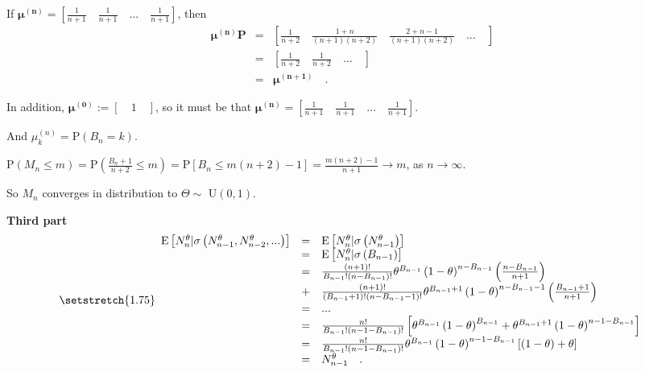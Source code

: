 \documentclass[11pt]{article} %
\begin{document}
If $\boldsymbol{\mu^{(n)}}=\left[\frac{1}{n+1} \quad
\frac{1}{n+1} \quad \hdots \quad \frac{1}{n+1}\right]$, then
\begin{equation*}
\begin{array}{lll}
 \boldsymbol{\mu^{(n)}}\mathbf{P}&=&\left[\frac{1}{n+2} \quad \frac{1+n}{(n+1)(n+2)}\quad \frac{2+n-1}{(n+1) (n+2)} \quad \hdots\quad\right]\\
 &=& \left[\frac{1}{n+2} \quad \frac{1}{n+2} \quad \hdots \quad \right]\\
&=&\boldsymbol{\mu^{(n+1)}} \quad .
\end{array}
\end{equation*}

In addition, $\boldsymbol{\mu^{(0)}}:=\left[\quad 1 \quad \right]$, so it must be that $\boldsymbol{\mu^{(n)}}=\left[\frac{1}{n+1} \quad
\frac{1}{n+1} \quad \hdots \quad \frac{1}{n+1}\right]$. 

And $\mu^{(n)}_{k}=\mathrm{P}\left(B_{n}=k\right)$.
\vspace{\baselineskip}


$\mathrm{P} \left(M_{n} \leq m\right)= \mathrm{P} \left(\frac{B_{n}+1}{n+2} \leq m \right)=\mathrm{P}\left[ B_{n} \leq m(n+2)-1\right]=\frac{m(n+2)-1}{n+1} \to m$, as $n \to \infty$.

So $M_{n}$ converges in distribution to $\Theta \sim$ U$(0,1)$.  
\vspace{\baselineskip}

\textbf{Third part}
\begin{equation*}
{\setstretch{1.75}
\begin{array}{lll}
\mathrm{E}\left[N^{\theta}_{n}|\sigma \left(N^{\theta}_{n-1},N^{\theta}_{n-2}, ...\right)\right]&=&\mathrm{E}\left[N^{\theta}_{n}|\sigma \left(N^{\theta}_{n-1}\right)\right]\\
&=&\mathrm{E}\left[N^{\theta}_{n}|\sigma \left(B_{n-1}\right)\right]\\
&=&\frac{\left(n+1\right)!}{B_{n-1}!\left(n-B_{n-1}\right)!}\theta^{B_{n-1}}\left(1-\theta\right)^{n-B_{n-1}}\left(\frac{n-B_{n-1}}{n+1}\right)\\
&+&\frac{\left(n+1\right)!}{\left(B_{n-1}+1\right)!\left(n-B_{n-1}-1\right)!}\theta^{B_{n-1}+1}\left(1-\theta\right)^{n-B_{n-1}-1}\left(\frac{B_{n-1}+1}{n+1}\right)\\
&=&...\\
&=&\frac{n!}{B_{n-1}!\left(n-1-B_{n-1}\right)!}\left[\theta^{B_{n-1}}\left(1-\theta\right)^{B_{n-1}}+\theta^{B_{n-1}+1}\left(1-\theta\right)^{n-1-B_{n-1}}\right]\\
&=&\frac{n!}{B_{n-1}!\left(n-1-B_{n-1}\right)!}\theta^{B_{n-1}}\left(1-\theta\right)^{n-1-B_{n-1}}\left[\left(1-\theta\right)+\theta\right]\\
&=&N^{\theta}_{n-1} \quad.
\end{array}
}
\end{equation*}





 



\clearpage


\end{document}
